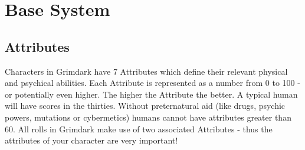 \chapter{Base System}
\section{Attributes}\label{Attributes}
Characters in Grimdark have 7 Attributes which define their relevant physical and psychical abilities.
Each Attribute is represented as a number from 0 to 100 - or potentially even higher.
The higher the Attribute the better.
A typical human will have scores in the thirties.
Without preternatural aid (like drugs, psychic powers, mutations or cybermetics) humans cannot have attributes greater than 60. 
All rolls in Grimdark make use of two associated Attributes - thus the attributes of your character are very important!
